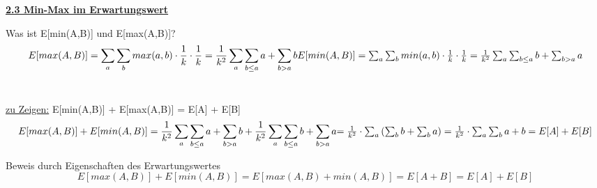 \documentclass{article}
\begin{document}
\textbf{\underline{2.3 Min-Max im Erwartungswert}} \\
\begin{compactenum}[a)]
	\item Was ist E[min(A,B)] und E[max(A,B)]? \\
	\[
	E[max(A, B)] = \sum_{a} \sum_{b} max(a, b) \cdot \frac{1}{k} \cdot \frac{1}{k}
	= \frac{1}{k^2} \sum_{a} \sum_{b \leq a} a + \sum_{b>a} b $$ $$
	E[min(A, B)] = \sum_{a} \sum_{b} min(a, b) \cdot \frac{1}{k} \cdot \frac{1}{k}
	= \frac{1}{k^2} \sum_{a} \sum_{b \leq a} b + \sum_{b>a} a $$ $$
	\]
	\\
	\item \underline{zu Zeigen:} E[min(A,B)] + E[max(A,B)] = E[A] + E[B] \\
	\[
	E[max(A, B)] + E[min(A, B)] = \frac{1}{k^2} \sum_{a} \sum_{b \leq a} a + \sum_{b>a} b + \frac{1}{k^2} \sum_{a} \sum_{b \leq a} b + \sum_{b>a} a $$ $$
	= \frac{1}{k^2} \cdot \sum_{a} \left(\sum_{b} b + \sum_{b} a \right) = \frac{1}{k^2} \cdot \sum_{a}\sum_{b} a+b = E[A] + E[B] $$ $$
	\]
	\newpage
	\item Beweis durch Eigenschaften des Erwartungswertes \\
	\[
	E[max(A, B)] + E[min(A, B)] = E[max(A, B) + min(A, B)] = E[A + B] = E[A] + E[B]
	\]
	\\
	
\end{compactenum}
\end{document}
